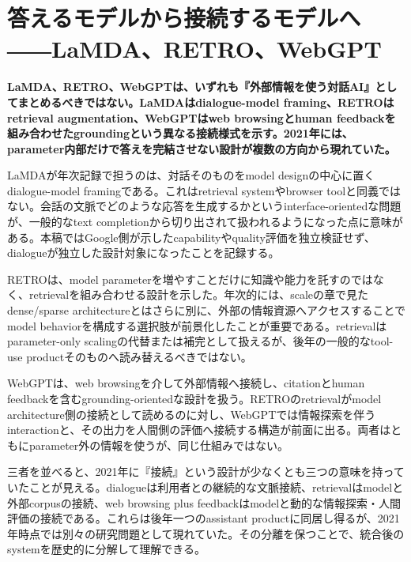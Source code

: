 \section{答えるモデルから接続するモデルへ――LaMDA、RETRO、WebGPT}
\label{pkg:dialogue-retrieval-grounding}
\noindent\textbf{LaMDA、RETRO、WebGPTは、いずれも『外部情報を使う対話AI』としてまとめるべきではない。LaMDAはdialogue-model framing、RETROはretrieval augmentation、WebGPTはweb browsingとhuman feedbackを組み合わせたgroundingという異なる接続様式を示す。2021年には、parameter内部だけで答えを完結させない設計が複数の方向から現れていた。}\autocite{src-66643bb115ae,src-6ab2302937b2,src-72eada5e8850,src-a3971b3f646f,src-bb1464aabad9}

LaMDAが年次記録で担うのは、対話そのものをmodel designの中心に置くdialogue-model framingである。これはretrieval systemやbrowser toolと同義ではない。会話の文脈でどのような応答を生成するかというinterface-orientedな問題が、一般的なtext completionから切り出されて扱われるようになった点に意味がある。本稿ではGoogle側が示したcapabilityやquality評価を独立検証せず、dialogueが独立した設計対象になったことを記録する。\autocite{src-a3971b3f646f}


RETROは、model parameterを増やすことだけに知識や能力を託すのではなく、retrievalを組み合わせる設計を示した。年次的には、scaleの章で見たdense/sparse architectureとはさらに別に、外部の情報資源へアクセスすることでmodel behaviorを構成する選択肢が前景化したことが重要である。retrievalはparameter-only scalingの代替または補完として扱えるが、後年の一般的なtool-use productそのものへ読み替えるべきではない。\autocite{src-66643bb115ae,src-6ab2302937b2}


WebGPTは、web browsingを介して外部情報へ接続し、citationとhuman feedbackを含むgrounding-orientedな設計を扱う。RETROのretrievalがmodel architecture側の接続として読めるのに対し、WebGPTでは情報探索を伴うinteractionと、その出力を人間側の評価へ接続する構造が前面に出る。両者はともにparameter外の情報を使うが、同じ仕組みではない。\autocite{src-72eada5e8850,src-bb1464aabad9}


三者を並べると、2021年に『接続』という設計が少なくとも三つの意味を持っていたことが見える。dialogueは利用者との継続的な文脈接続、retrievalはmodelと外部corpusの接続、web browsing plus feedbackはmodelと動的な情報探索・人間評価の接続である。これらは後年一つのassistant productに同居し得るが、2021年時点では別々の研究問題として現れていた。その分離を保つことで、統合後のsystemを歴史的に分解して理解できる。\autocite{src-66643bb115ae,src-6ab2302937b2,src-72eada5e8850,src-a3971b3f646f,src-bb1464aabad9}



